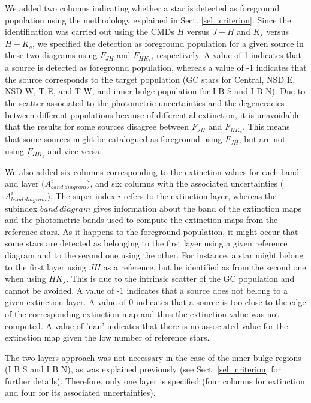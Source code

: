 \documentclass{aa}
\begin{document}
We added two columns indicating whether a star is detected as foreground population using the methodology explained in Sect. \ref{sel_criterion}. Since the identification was carried out using the CMDs $H$ versus $J-H$ and $K_s$ versus $H-K_s$, we specified the detection as foreground population for a given source in these two diagrams using $F_{JH}$ and $F_{HK_s}$, respectively. A value of 1 indicates that a source is detected as foreground population, whereas a value of -1 indicates that the source corresponds to the target population (GC stars for Central, NSD E, NSD W, T E, and T W, and inner bulge population for I B S and I B N).  Due to the scatter associated to the photometric uncertainties and the degeneracies between different populations because of  differential extinction, it is unavoidable that the results for some sources disagree between $F_{JH}$ and $F_{HK_s}$. This means that some sources might be catalogued as foreground using $F_{JH}$, but are not using $F_{HK_s}$ and vice versa.


We also added six columns corresponding to the extinction values for each band and layer ($A^i_{band\ diagram }$), and six columns with the associated uncertainties ($A^i_{band\ diagram }$).  The super-index $i$ refers to the extinction layer, whereas the subindex $band\ diagram$ gives information about the band of the extinction maps and the photometric bands used to compute the extinction maps from the reference stars. As it happens to the foreground population, it might occur that some stars are detected as belonging to the first layer using a given reference diagram and to the second one using the other. For instance, a star might belong to the first layer using $JH$ as a reference, but be identified as from the second one when using $HK_s$. This is due to the intrinsic scatter of the GC population and cannot be avoided. A value of -1 indicates that a source does not belong to a given extinction layer. A value of 0 indicates that a source is too close to the edge of the corresponding extinction map and thus the extinction value was not computed. A value of 'nan' indicates that there is no associated value for the extinction map given the low number of reference stars.

The two-layers approach was not necessary in the case of the inner bulge regions (I B S and I B N), as  was explained previously (see Sect. \ref{sel_criterion} for further details). Therefore, only one layer is specified (four columns for extinction and four for its associated uncertainties).
\end{document}
